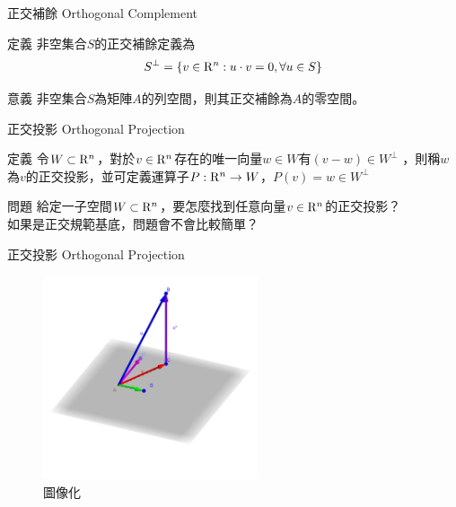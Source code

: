 \documentclass[14pt]{beamer}
\begin{document}
\begin{frame}{正交補餘 Orthogonal Complement}
	\begin{alertblock}{定義}
		非空集合$S$的正交補餘定義為
		\begin{equation*}
		S^{\bot } =\left\{v\in {\rm R}^{n} :u\cdot v=0,\forall u\in S\right\} 
		\end{equation*}
	\end{alertblock}
	\begin{exampleblock}{意義}
		非空集合$S$為矩陣$A$的列空間，則其正交補餘為$A$的零空間。
	\end{exampleblock}
\end{frame}
\begin{frame}{正交投影 Orthogonal Projection}
	\begin{alertblock}{定義}
		令$W\subset {\rm R}^{n} $，對於$v\in {\rm R}^{n} $存在的唯一向量$w\in W$有$\left(v-w\right)\in W^{\perp}$ ，則稱$w$為$v$的正交投影，並可定義運算子$P:{\rm R}^{n} \rightarrow W$，$P(v)=w\in W^ \perp$
		\begin{exampleblock}{問題}
			給定一子空間$W\subset {\rm R}^n$，要怎麼找到任意向量$v\in {\rm R}^n$的正交投影？\\
			如果是正交規範基底，問題會不會比較簡單？
		\end{exampleblock}
	\end{alertblock}	
\end{frame}
\begin{frame}{正交投影 Orthogonal Projection}
	\begin{figure}[H]
		\centering
		\includegraphics[height=6cm]{orthogonalprojection.png}
		\caption{圖像化}
		\label{fig:orthogonal-projection}
	\end{figure}	
\end{frame}
\end{document}
